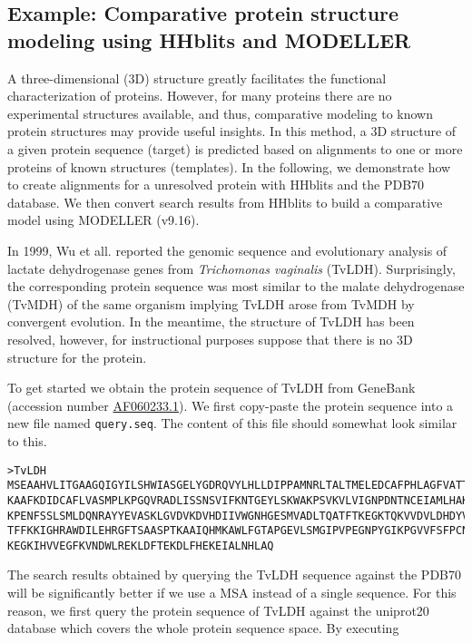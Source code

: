 \documentclass[11pt,a4paper]{article}
\begin{document}
\subsection*{Example: Comparative protein structure modeling using HHblits and MODELLER}

A three-dimensional (3D) structure greatly facilitates the functional characterization of proteins. However, for many proteins there are no experimental structures available, and thus, comparative modeling to known protein structures may provide useful insights. In this method, a 3D structure of a given protein sequence (target) is predicted based on alignments to one or more proteins of known structures (templates). In the following, we demonstrate how to create alignments for a unresolved protein with HHblits and the PDB70 database. We then convert search results from HHblits to build a comparative model using MODELLER (v9.16).

In 1999, Wu et all. reported the genomic sequence and evolutionary analysis of lactate dehydrogenase genes from \textit{Trichomonas vaginalis} (TvLDH). Surprisingly, the corresponding protein sequence was most similar to the malate dehydrogenase (TvMDH) of the same organism implying TvLDH arose from TvMDH by convergent evolution. In the meantime, the structure of TvLDH has been resolved, however, for instructional purposes suppose that there is no 3D structure for the protein. 

To get started we obtain the protein sequence of TvLDH from GeneBank (accession number \href{http://www.ncbi.nlm.nih.gov/nuccore/AF060233}{AF060233.1}). We first copy-paste the protein sequence into a new file named \verb`query.seq`. The content of this file should somewhat look similar to this.

\footnotesize 
\begin{verbatim}
>TvLDH
MSEAAHVLITGAAGQIGYILSHWIASGELYGDRQVYLHLLDIPPAMNRLTALTMELEDCAFPHLAGFVATTDP
KAAFKDIDCAFLVASMPLKPGQVRADLISSNSVIFKNTGEYLSKWAKPSVKVLVIGNPDNTNCEIAMLHAKNL
KPENFSSLSMLDQNRAYYEVASKLGVDVKDVHDIIVWGNHGESMVADLTQATFTKEGKTQKVVDVLDHDYVFD
TFFKKIGHRAWDILEHRGFTSAASPTKAAIQHMKAWLFGTAPGEVLSMGIPVPEGNPYGIKPGVVFSFPCNVD
KEGKIHVVEGFKVNDWLREKLDFTEKDLFHEKEIALNHLAQ
\end{verbatim}
\normalsize

The search results obtained by querying the TvLDH sequence against the PDB70 will be significantly better if we use a MSA instead of a single sequence. For this reason, we first query the protein sequence of TvLDH against the uniprot20 database which covers the whole protein sequence space. By executing
\end{document}
